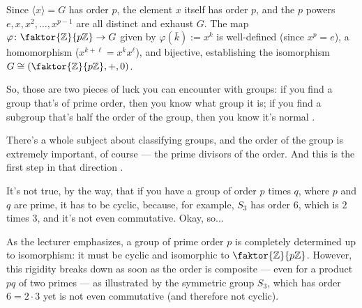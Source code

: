 \begin{proofWrapper}
\begin{content}
\begin{steps}
Since $\langle x \rangle = G$ has order $p$, the element $x$ itself has order $p$, and the $p$ powers $e, x, x^2, \dots, x^{p-1}$ are all distinct and exhaust $G$. The map $\varphi \colon \faktor{\mathbb{Z}}{p\mathbb{Z}} \to G$ given by $\varphi(\bar{k}) := x^k$ is well-defined (since $x^p = e$), a homomorphism ($x^{k+\ell} = x^k x^\ell$), and bijective, establishing the isomorphism $G \cong \left(\faktor{\mathbb{Z}}{p\mathbb{Z}}, +, 0\right)$.
\end{steps}
\end{content}

\end{proofWrapper}

\begin{speech}[00:20:59 - 00:21:19]
So, those are two pieces of luck you can encounter with groups: if you find a group that's of prime order, then you know what group it is; if you find a subgroup that's half the order of the group, then you know it's normal .
\end{speech}

\begin{speech}[00:21:21 - 00:21:48]
There's a whole subject about classifying groups, and the order of the group is extremely important, of course --- the prime divisors of the order. And this is the first step in that direction .

It's not true, by the way, that if you have a group of order $p$ times $q$, where $p$ and $q$ are prime, it has to be cyclic, because, for example, $S_3$ has order $6$, which is $2$ times $3$, and it's not even commutative. Okay, so...
\end{speech}

\begin{insight}
As the lecturer emphasizes, a group of prime order $p$ is completely determined up to isomorphism: it must be cyclic and isomorphic to $\faktor{\mathbb{Z}}{p\mathbb{Z}}$. However, this rigidity breaks down as soon as the order is composite --- even for a product $pq$ of two primes --- as illustrated by the symmetric group $S_3$, which has order $6 = 2 \cdot 3$ yet is not even commutative (and therefore not cyclic).
\end{insight}

